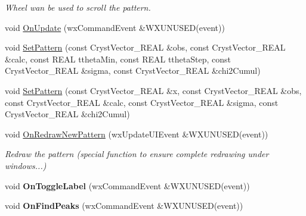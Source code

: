 \begin{DoxyCompactItemize}
\begin{DoxyCompactList}\small\item\em Wheel wan be used to scroll the pattern. \end{DoxyCompactList}\item 
void \mbox{\hyperlink{class_obj_cryst_1_1_w_x_powder_pattern_graph_a89fe469c2774080b89e5fe43ded2e412}{On\+Update}} (wx\+Command\+Event \&W\+X\+U\+N\+U\+S\+ED(event))
\item 
void \mbox{\hyperlink{class_obj_cryst_1_1_w_x_powder_pattern_graph_a6a35318893c5a0f03d2d05b0bab9f1a8}{Set\+Pattern}} (const Cryst\+Vector\+\_\+\+R\+E\+AL \&obs, const Cryst\+Vector\+\_\+\+R\+E\+AL \&calc, const R\+E\+AL ttheta\+Min, const R\+E\+AL ttheta\+Step, const Cryst\+Vector\+\_\+\+R\+E\+AL \&sigma, const Cryst\+Vector\+\_\+\+R\+E\+AL \&chi2\+Cumul)
\item 
void \mbox{\hyperlink{class_obj_cryst_1_1_w_x_powder_pattern_graph_af74825c7f7b2c132b9942a684b0311fe}{Set\+Pattern}} (const Cryst\+Vector\+\_\+\+R\+E\+AL \&x, const Cryst\+Vector\+\_\+\+R\+E\+AL \&obs, const Cryst\+Vector\+\_\+\+R\+E\+AL \&calc, const Cryst\+Vector\+\_\+\+R\+E\+AL \&sigma, const Cryst\+Vector\+\_\+\+R\+E\+AL \&chi2\+Cumul)
\item 
\mbox{\label{class_obj_cryst_1_1_w_x_powder_pattern_graph_ac15e3c9c014c8213eb368393f29ccefd}} 
void \mbox{\hyperlink{class_obj_cryst_1_1_w_x_powder_pattern_graph_ac15e3c9c014c8213eb368393f29ccefd}{On\+Redraw\+New\+Pattern}} (wx\+Update\+U\+I\+Event \&W\+X\+U\+N\+U\+S\+ED(event))
\begin{DoxyCompactList}\small\item\em Redraw the pattern (special function to ensure complete redrawing under windows...) \end{DoxyCompactList}\item 
\mbox{\label{class_obj_cryst_1_1_w_x_powder_pattern_graph_aa7a732762311a3b0f7f96c5eefda859c}} 
void {\bfseries On\+Toggle\+Label} (wx\+Command\+Event \&W\+X\+U\+N\+U\+S\+ED(event))
\item 
\mbox{\label{class_obj_cryst_1_1_w_x_powder_pattern_graph_ae1f0d5362783460a37fd83c7fb85b548}} 
void {\bfseries On\+Find\+Peaks} (wx\+Command\+Event \&W\+X\+U\+N\+U\+S\+ED(event))
\item 
\mbox{\label{class_obj_cryst_1_1_w_x_powder_pattern_graph_a52682cde801fa2ff54d2e20323f7fa0c}} 

\end{DoxyCompactItemize}
